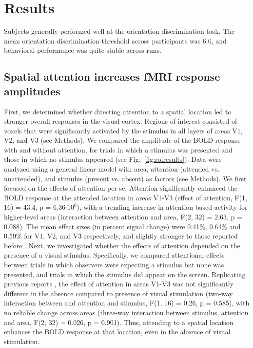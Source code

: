 \section{Results}
Subjects generally performed well at the orientation discrimination task. The mean orientation discrimination threshold across participants was 6.6\textdegree, and behavioral performance was quite stable across runs.

\subsection{Spatial attention increases fMRI response amplitudes}
First, we determined whether directing attention to a spatial location led to stronger overall responses in the visual cortex. Regions of interest consisted of voxels that were significantly activated by the stimulus in all layers of areas V1, V2, and V3 (see Methods). We compared the amplitude of the BOLD response with and without attention, for trials in which a stimulus was presented and those in which no stimulus appeared (see Fig.~\ref{fig:roiresults}). Data were analyzed using a general linear model with area, attention (attended vs. unattended), and stimulus (present vs. absent) as factors (see Methods). We first focused on the effects of attention per se. Attention significantly enhanced the BOLD response at the attended location in areas V1-V3 (effect of attention, F(1, 16) = 43.4, p = 6.36$\cdot10^6$), with a trending increase in attention-based activity for higher-level areas (interaction between attention and area, F(2, 32) = 2.63, p = 0.088). The mean effect sizes (in percent signal change) were 0.41\%, 0.64\% and 0.59\% for V1, V2, and V3 respectively, and slightly stronger to those reported before \cite{Murray2008,Jehee2011}. Next, we investigated whether the effects of attention depended on the presence of a visual stimulus. Specifically, we compared attentional effects between trials in which observers were expecting a stimulus but none was presented, and trials in which the stimulus did appear on the screen. Replicating previous reports \cite{Kastner1999}, the effect of attention in areas V1-V3 was not significantly different in the absence compared to presence of visual stimulation (two-way interaction between and attention and stimulus, F(1, 16) = 0.26, p = 0.585), with no reliable change across areas (three-way interaction between stimulus, attention and area, F(2, 32) = 0.026, p = 0.901). Thus, attending to a spatial location enhances the BOLD response at that location, even in the absence of visual stimulation.


